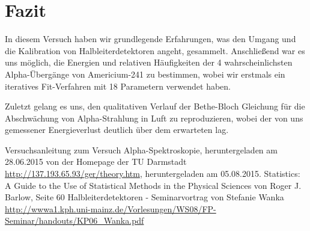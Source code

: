 \documentclass[bigchapter,colorback,accentcolor=tud4b,linedtoc,11pt]{tudreport}
\begin{document}
\chapter{Fazit}
In diesem Versuch haben wir grundlegende Erfahrungen, was den Umgang und die
Kalibration von Halbleiterdetektoren angeht, gesammelt. Anschließend war es uns
möglich, die Energien und relativen Häufigkeiten der 4 wahrscheinlichsten Alpha-Übergänge von
Americium-241 zu bestimmen, wobei wir erstmals ein iteratives Fit-Verfahren mit
18 Parametern verwendet haben.

Zuletzt gelang es uns, den qualitativen Verlauf der Bethe-Bloch Gleichung für
die Abschwächung von Alpha-Strahlung in Luft zu reproduzieren, wobei der von uns
gemessener Energieverlust deutlich über dem erwarteten lag.
\cleardoublepage{}
\newpage
\begin{thebibliography}{100}
   Versuchsanleitung zum Versuch Alpha-Spektroskopie, heruntergeladen am 28.06.2015 von der Homepage der TU Darmstadt
  \url{http://137.193.65.93/ger/theory.htm}, heruntergeladen am 05.08.2015.
   Statistics: A Guide to the Use of Statistical Methods in the
    Physical Sciences von Roger J. Barlow, Seite 60
   Halbleiterdetektoren - Seminarvortrag von Stefanie Wanka \url{http://wwwa1.kph.uni-mainz.de/Vorlesungen/WS08/FP-Seminar/handouts/KP06_Wanka.pdf}
\end{thebibliography}
\end{document}
